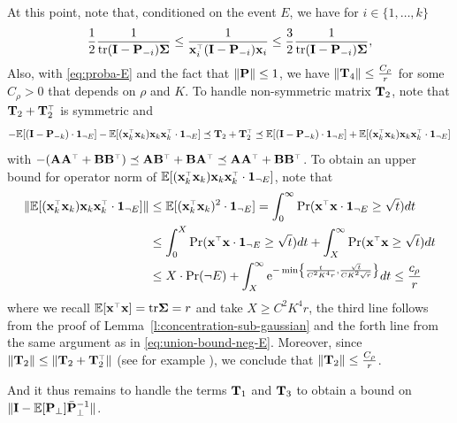 \documentclass[thesis.tex]{subfiles}
\begin{document}
\medskip

At this point, note that, conditioned on the event $E$, we have for $i \in \{1, \ldots, k \}$
\begin{equation}
    \frac12 \frac1{\tr (\I - \P_{-i}) \Sigmab} \le \frac1{\x_i^\top (\I - \P_{-i}) \x_i} \le \frac32 \frac1{\tr (\I - \P_{-i}) \Sigmab}, %
\end{equation}
Also, with \eqref{eq:proba-E} and the fact that $\| \P \| \le 1$, we have $ \| \T_4 \| \le
\frac{C_\rho}{r}$ for some $C_\rho > 0$ that depends on $\rho$ and $K$. To handle non-symmetric matrix $\T_2$, note that $\T_2 + \T_2^\top$ is symmetric and
\begin{equation}
  - \E[ (\I - \P_{-k}) \cdot \one_{\neg E}] - \E[ (\x_k^\top \x_k) \x_k\x_k^\top \cdot \one_{\neg E}] \preceq \T_2 + \T_2^\top \preceq \E[ (\I - \P_{-k}) \cdot \one_{\neg E}] + \E[ (\x_k^\top \x_k) \x_k\x_k^\top \cdot \one_{\neg E}]
\end{equation}
with $-(\A \A^\top + \B \B^\top) \preceq \A \B^\top + \B \A^\top \preceq \A \A^\top + \B \B^\top$. To obtain an upper bound for operator norm of $\E[ (\x_k^\top \x_k) \x_k\x_k^\top \cdot \one_{\neg E}]$, note that 
\begin{align*}
  \| \E[ (\x_k^\top \x_k) \x_k\x_k^\top \cdot \one_{\neg E}] \| &\le \E[ (\x_k^\top \x_k)^2 \cdot \one_{\neg E}] = \int_0^\infty \Pr ( \x^\top \x \cdot \one_{\neg E} \ge \sqrt t ) dt \\ 
  &\le \int_0^X \Pr ( \x^\top \x \cdot \one_{\neg E} \ge \sqrt t ) dt + \int_X^\infty \Pr ( \x^\top \x \ge \sqrt t ) dt  \\ 
  &\le X \cdot \Pr(\neg E) + \int_X^\infty \ee^{- \min \left\{ \frac{t}{C^2 K^4 r}, \frac{\sqrt t}{CK^2 \sqrt r} \right\} } dt \le \frac{c_\rho}r
\end{align*}
where we recall $\E[\x^\top \x] = \tr \Sigmab = r$ and take $X \ge C^2 K^4 r$, the third line follows from the proof of Lemma~\ref{l:concentration-sub-gaussian} and the forth line from the same argument as in \eqref{eq:union-bound-neg-E}. Moreover, since $\| \T_2 \| \le \| \T_2 + \T_2^\top \|$ (see for example \cite[Proposition~5.11]{serre2010matrices}), we conclude that $\| \T_2 \| \le \frac{C_\rho}r$.


And it thus remains to handle the terms $\T_1$ and $\T_3$ to obtain a bound on $\| \I - \E[\P_\perp] \bar \P_\perp^{-1} \| $. 
\end{document}
